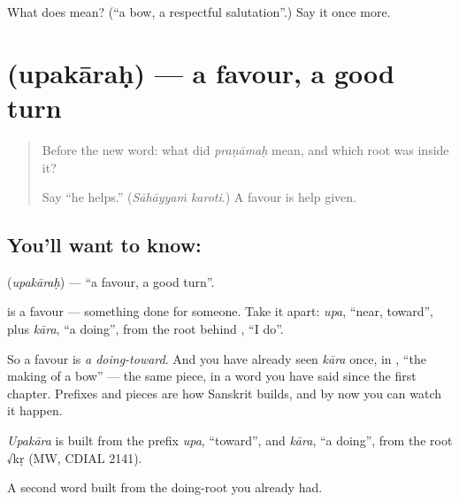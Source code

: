 \begin{tcolorbox}[breakable,colback=teal!4,colframe=teal!35!black,title={Before you move on}]
What does  mean? (\textquotedblleft{}a bow, a respectful salutation\textquotedblright{}.) Say it once more.
\end{tcolorbox}
\section[\texorpdfstring{\sk{उपकारः} (upakāraḥ)}{उपकारः (upakāraḥ)}]{ (upakāraḥ) — a favour, a good turn}

\label{lesson:SA-C29-favour}



\begin{quote}
Before the new word: what did \emph{praṇāmaḥ} mean, and which root was inside it?

Say \textquotedblleft{}he helps.\textquotedblright{} (\emph{Sāhāyyaṁ karoti}.) A favour is help given.
\end{quote}

\subsection*{You'll want to know: }
\textbf{} (\emph{upakāraḥ}) — \textquotedblleft{}a favour, a good turn\textquotedblright{}.

\textbf{} is a favour — something done for someone. Take it apart: \emph{upa}, \textquotedblleft{}near, toward\textquotedblright{}, plus \emph{kāra}, \textquotedblleft{}a doing\textquotedblright{}, from the root behind \textbf{}, \textquotedblleft{}I do\textquotedblright{}.

So a favour is \emph{a doing-toward}. And you have already seen \emph{kāra} once, in , \textquotedblleft{}the making of a bow\textquotedblright{} — the same piece, in a word you have said since the first chapter. Prefixes and pieces are how Sanskrit builds, and by now you can watch it happen.

\begin{cousinweb}
\emph{Upakāra} is built from the prefix \emph{upa}, \textquotedblleft{}toward\textquotedblright{}, and \emph{kāra}, \textquotedblleft{}a doing\textquotedblright{}, from the root √kṛ (MW, CDIAL 2141).
\end{cousinweb}

\begin{grammarlens}[title={What you've built}]
A second word built from the doing-root you already had.
\end{grammarlens}

